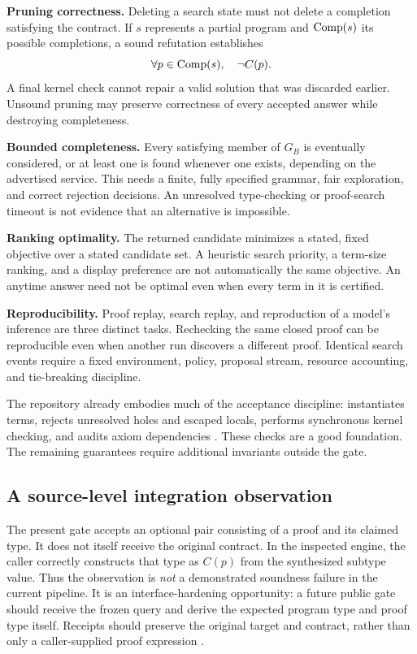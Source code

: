 \textbf{Pruning correctness.} Deleting a search state must not delete a completion satisfying the contract. If $s$ represents a partial program and $\operatorname{Comp}(s)$ its possible completions, a sound refutation establishes
\[
  \forall p\in\operatorname{Comp}(s),\quad \neg C(p).
\]
A final kernel check cannot repair a valid solution that was discarded earlier. Unsound pruning may preserve correctness of every accepted answer while destroying completeness.

\textbf{Bounded completeness.} Every satisfying member of $G_B$ is eventually considered, or at least one is found whenever one exists, depending on the advertised service. This needs a finite, fully specified grammar, fair exploration, and correct rejection decisions. An unresolved type-checking or proof-search timeout is not evidence that an alternative is impossible.

\textbf{Ranking optimality.} The returned candidate minimizes a stated, fixed objective over a stated candidate set. A heuristic search priority, a term-size ranking, and a display preference are not automatically the same objective. An anytime answer need not be optimal even when every term in it is certified.

\textbf{Reproducibility.} Proof replay, search replay, and reproduction of a model's inference are three distinct tasks. Rechecking the same closed proof can be reproducible even when another run discovers a different proof. Identical search events require a fixed environment, policy, proposal stream, resource accounting, and tie-breaking discipline.

The repository already embodies much of the acceptance discipline:  instantiates terms, rejects unresolved holes and escaped locals, performs synchronous kernel checking, and audits axiom dependencies \cite{gate}. These checks are a good foundation. The remaining guarantees require additional invariants outside the gate.

\subsection{A source-level integration observation}

The present gate accepts an optional pair consisting of a proof and its claimed type. It does not itself receive the original contract. In the inspected engine, the caller correctly constructs that type as $C(p)$ from the synthesized subtype value. Thus the observation is \emph{not} a demonstrated soundness failure in the current pipeline. It is an interface-hardening opportunity: a future public gate should receive the frozen query and derive the expected program type and proof type itself. Receipts should preserve the original target and contract, rather than only a caller-supplied proof expression \cite{gate,engine,coretypes}.

